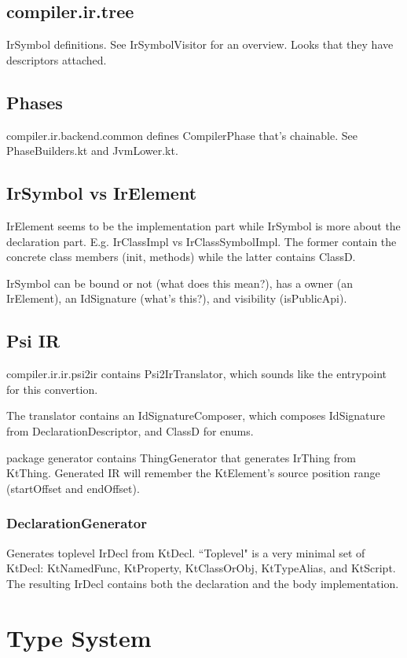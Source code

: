 \documentclass{article}
\begin{document}
\subsection{compiler.ir.tree}
IrSymbol definitions. See IrSymbolVisitor for an overview. Looks that they have descriptors attached.

\subsection{Phases}
compiler.ir.backend.common defines CompilerPhase that's chainable. See PhaseBuilders.kt and JvmLower.kt.

\subsection{IrSymbol vs IrElement}
IrElement seems to be the implementation part while IrSymbol is more about the declaration part. E.g. IrClassImpl vs IrClassSymbolImpl. The former contain the concrete class members (init, methods) while the latter contains ClassD.

IrSymbol can be bound or not (what does this mean?), has a owner (an IrElement), an IdSignature (what's this?), and visibility (isPublicApi).

\subsection{Psi \textSafeTo IR}

compiler.ir.ir.psi2ir contains Psi2IrTranslator, which sounds like the entrypoint for this convertion.

The translator contains an IdSignatureComposer, which composes IdSignature from DeclarationDescriptor, and ClassD for enums.

package generator contains ThingGenerator that generates IrThing from KtThing. Generated IR will remember the KtElement's source position range (startOffset and endOffset).

\subsubsection{DeclarationGenerator}

Generates toplevel IrDecl from KtDecl. ``Toplevel" is a very minimal set of KtDecl: KtNamedFunc, KtProperty, KtClassOrObj, KtTypeAlias, and KtScript. The resulting IrDecl contains both the declaration and the body implementation.

\section{Type System}
\end{document}
